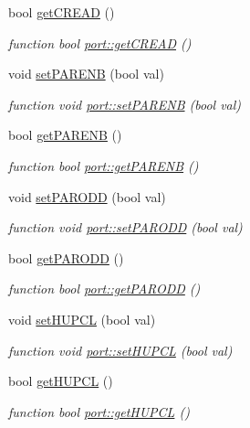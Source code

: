 \begin{DoxyCompactItemize}
bool \hyperlink{classport_a8c686ab18882de329b1c5666688724d6}{get\+C\+R\+E\+AD} ()
\begin{DoxyCompactList}\small\item\em function bool \hyperlink{classport_a8c686ab18882de329b1c5666688724d6}{port\+::get\+C\+R\+E\+AD} () \end{DoxyCompactList}\item 
void \hyperlink{classport_a38427fe381f2db5d296748d426ca58bf}{set\+P\+A\+R\+E\+NB} (bool val)
\begin{DoxyCompactList}\small\item\em function void \hyperlink{classport_a38427fe381f2db5d296748d426ca58bf}{port\+::set\+P\+A\+R\+E\+NB} (bool val) \end{DoxyCompactList}\item 
bool \hyperlink{classport_a4d3e68b6545fdfae4b62d94c152aa5c5}{get\+P\+A\+R\+E\+NB} ()
\begin{DoxyCompactList}\small\item\em function bool \hyperlink{classport_a4d3e68b6545fdfae4b62d94c152aa5c5}{port\+::get\+P\+A\+R\+E\+NB} () \end{DoxyCompactList}\item 
void \hyperlink{classport_ac236d1a60de223b09b225708c11d3c95}{set\+P\+A\+R\+O\+DD} (bool val)
\begin{DoxyCompactList}\small\item\em function void \hyperlink{classport_ac236d1a60de223b09b225708c11d3c95}{port\+::set\+P\+A\+R\+O\+DD} (bool val) \end{DoxyCompactList}\item 
bool \hyperlink{classport_ac07219c7d113a9671c8b00e3e6e9e26a}{get\+P\+A\+R\+O\+DD} ()
\begin{DoxyCompactList}\small\item\em function bool \hyperlink{classport_ac07219c7d113a9671c8b00e3e6e9e26a}{port\+::get\+P\+A\+R\+O\+DD} () \end{DoxyCompactList}\item 
void \hyperlink{classport_aebb52d4483ac46fc85b44f5839a56f10}{set\+H\+U\+P\+CL} (bool val)
\begin{DoxyCompactList}\small\item\em function void \hyperlink{classport_aebb52d4483ac46fc85b44f5839a56f10}{port\+::set\+H\+U\+P\+CL} (bool val) \end{DoxyCompactList}\item 
bool \hyperlink{classport_a6d49ff5c1b9d5dd932c08986e261f090}{get\+H\+U\+P\+CL} ()
\begin{DoxyCompactList}\small\item\em function bool \hyperlink{classport_a6d49ff5c1b9d5dd932c08986e261f090}{port\+::get\+H\+U\+P\+CL} () \end{DoxyCompactList}\item 

\end{DoxyCompactItemize}
